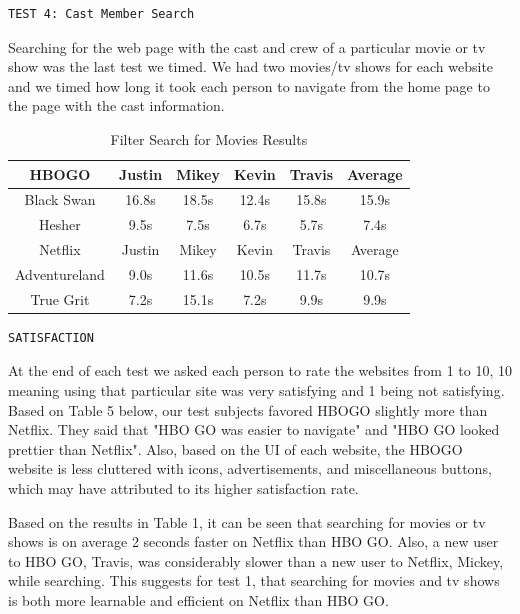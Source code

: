 \documentclass[11pt]{article}
\begin{document}
\begin{verbatim}
TEST 4: Cast Member Search
\end{verbatim}
Searching for the web page with the cast and crew of a particular movie or tv show was the last test we timed. We had two movies/tv shows for each website and we timed how long it took each person to navigate from the home page to the page with the cast information.

\begin{table}[ht]
\caption{Filter Search for Movies Results} 				%
\centering 									%
\begin{tabular}{|c|c c c c|c|} %
\hline\hline 									%
HBOGO  &Justin& Mikey&Kevin&Travis&Average  \\ [0.5ex] 	    %
\hline 									    %
Black Swan  &16.8s & 18.5s&12.4s&15.8s&15.9s          \\			 %
Hesher &9.5s&7.5s&6.7s&5.7s&7.4s                             \\
\hline
Netflix &Justin& Mikey&Kevin&Travis&Average   \\ [0.5ex] 			%
\hline
Adventureland &9.0s&11.6s&10.5s&11.7s&10.7s          \\
True Grit &7.2s&15.1s&7.2s&9.9s&9.9s                         \\
\hline 										%
\end{tabular}
\label{table:nonlin} %
\end{table}

\begin{verbatim}
SATISFACTION
\end{verbatim}
At the end of each test we asked each person to rate the websites from 1 to 10, 10 meaning using that particular site was very satisfying and 1 being not satisfying. Based on Table 5 below, our test subjects favored HBOGO slightly more than Netflix. They said that "HBO GO was easier to navigate" and "HBO GO looked prettier than Netflix". Also, based on the UI of each website, the HBOGO website is less cluttered with icons, advertisements, and miscellaneous buttons, which may have attributed to its higher satisfaction rate.

Based on the results in Table 1, it can be seen that searching for movies or tv shows is on average 2 seconds faster on Netflix than HBO GO. Also, a new user to HBO GO, Travis, was considerably slower than a new user to Netflix, Mickey, while searching. This suggests for test 1, that searching for movies and tv shows is both more learnable and efficient on Netflix than HBO GO.
\end{document}
